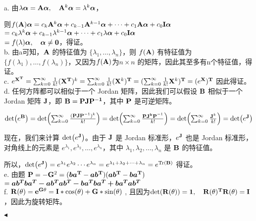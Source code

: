 \documentclass[11pt]{article}
\newenvironment{question}[2][Question]{\begin{trivlist}
\item[\hskip \labelsep {\bfseries #1}\hskip \labelsep {\bfseries #2.}]}{\hfill$\blacktriangleleft$\end{trivlist}}
\begin{document}
    \begin{question}{2 (20') (矩阵特征值)}~

    a. 由$\lambda \vb*{\alpha} = \vb{A} \vb*{\alpha}, \quad \vb{A}^k \vb*\alpha = \lambda^k \vb*{\alpha}$，
    
    则$f(\vb{A}) \vb*{\alpha} = c_k \vb{A}^k\vb*{\alpha} + c_{k-1} \vb{A}^{k-1}\vb*{\alpha} + \cdots + c_1 \vb{A}\vb*{\alpha} + c_0 \vb{I}\vb*{\alpha}$\\
    $= c_k \lambda^k\vb*{\alpha} + c_{k-1} \lambda^{k-1}\vb*{\alpha} + \cdots + c_1 \lambda\vb*{\alpha} + c_0 \vb{I}\vb*{\alpha}$\\
    $=f(\lambda) \vb*{\alpha}, \quad \vb*{\alpha} \neq \vb*{0}$，得证。\\

    b. 由a可知，$\vb{A}$ 的特征值为 $\{\lambda_1, \ldots, \lambda_n\}$，则 $f(\vb{A})$ 有特征值为 $\{f(\lambda_1), \ldots, f(\lambda_n)\}$，又因为$f(\vb{A})$为$n \times n$
    的矩阵，因此其至多有n个特征值，得证。\\

    c. $e^{\vb{X}^{\vb{T}}} = \sum_{k=0}^\infty \frac{1}{k!} ({\vb{X}^{\vb{T}}})^k = \sum_{k=0}^\infty \frac{1}{k!} ({\vb{X}^k})^{\vb{T}}
    = (\sum_{k=0}^\infty \frac{1}{k!} \vb{X}^k)^{\vb{T}} = (e^{\vb{X}})^{\vb{T}}$  因此得证。\\

    d. 任何方阵都可以相似于一个 Jordan 矩阵，因此我们可以假设 $\vb{B}$ 相似于一个 Jordan 矩阵 $\vb{J}$，即 $\vb{B} = \vb{PJP^{-1}}$，其中 $\vb{P}$ 是可逆矩阵。
    
    $
    \det (e^{\vb{B}}) = \det(\sum_{k=0}^{\infty} \frac{(\vb{PJP}^{-1})^k}{k!}) = \det(\sum_{k=0}^{\infty} \frac{\vb{PJ^kP}^{-1}}{k!}) = \det(\sum_{k=0}^{\infty}  \frac{\vb{J}^k}{k!}) = \det(e^{\vb{J}})
    $

    
    现在，我们来计算 $\det(e^{\vb{J}})$。由于 $\vb{J}$ 是 Jordan 标准形，$e^{\vb{J}}$ 也是 Jordan 标准形，对角线上的元素是 $e^{\lambda_1}, e^{\lambda_2}, \ldots, e^{\lambda_n}$，其中 $\lambda_1, \lambda_2, \ldots, \lambda_n$ 是 $\vb{B}$ 的特征值。
    
    所以，$\det(e^{\vb{J}}) = e^{\lambda_1} e^{\lambda_2} \cdots e^{\lambda_n} = e^{\lambda_1 + \lambda_2 + \cdots + \lambda_n} = e^{\text{Tr}(\vb{B})}$  得证。\\


    e. 由题 $\vb{P} = -\vb{G}^2 =(\vb*{b} \vb*{a}^{\vb{T}} - \vb*{a} \vb*{b}^{\vb{T}})(\vb*{a} \vb*{b}^{\vb{T}}  - \vb*{b} \vb*{a}^{\vb{T}})$\\
    $= \vb*{ab^Tba^T - ab^Tab^T - ba^Tba^T + ba^Tab^T}$\\

    f. $\vb{R(\theta) = e^{G\theta} = I* \cos(\theta) + G * \sin(\theta)}$ , 且因为$\vb{\det(R(\theta)) = 1, \quad R(\theta)^T R(\theta) = I}$，因此为旋转矩阵。


    \end{question}
\end{document}
